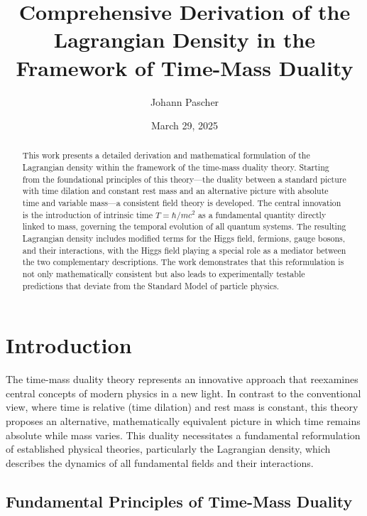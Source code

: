 \documentclass[a4paper,12pt]{article}
\begin{document}
	
	\title{Comprehensive Derivation of the Lagrangian Density in the Framework of Time-Mass Duality}
	\author{Johann Pascher}
	\date{March 29, 2025}
	
	\maketitle
	
	\begin{abstract}
		This work presents a detailed derivation and mathematical formulation of the Lagrangian density within the framework of the time-mass duality theory. Starting from the foundational principles of this theory—the duality between a standard picture with time dilation and constant rest mass and an alternative picture with absolute time and variable mass—a consistent field theory is developed. The central innovation is the introduction of intrinsic time \( T = \hbar/mc^2 \) as a fundamental quantity directly linked to mass, governing the temporal evolution of all quantum systems. The resulting Lagrangian density includes modified terms for the Higgs field, fermions, gauge bosons, and their interactions, with the Higgs field playing a special role as a mediator between the two complementary descriptions. The work demonstrates that this reformulation is not only mathematically consistent but also leads to experimentally testable predictions that deviate from the Standard Model of particle physics.
	\end{abstract}
	
	\tableofcontents
	\newpage
	
	\section{Introduction}
	
	The time-mass duality theory represents an innovative approach that reexamines central concepts of modern physics in a new light. In contrast to the conventional view, where time is relative (time dilation) and rest mass is constant, this theory proposes an alternative, mathematically equivalent picture in which time remains absolute while mass varies. This duality necessitates a fundamental reformulation of established physical theories, particularly the Lagrangian density, which describes the dynamics of all fundamental fields and their interactions.
	
	\subsection{Fundamental Principles of Time-Mass Duality}
	
\end{document}
